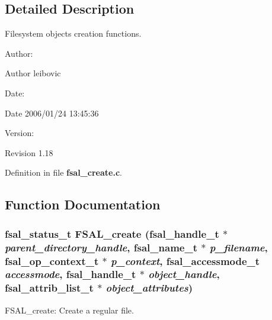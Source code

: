 \subsection{Detailed Description}
Filesystem objects creation functions. 

\begin{Desc}
\item[Author:]\end{Desc}
\begin{Desc}
\item[Author]leibovic \end{Desc}
\begin{Desc}
\item[Date:]\end{Desc}
\begin{Desc}
\item[Date]2006/01/24 13:45:36 \end{Desc}
\begin{Desc}
\item[Version:]\end{Desc}
\begin{Desc}
\item[Revision]1.18 \end{Desc}


Definition in file {\bf fsal\_\-create.c}.

\subsection{Function Documentation}
\subsubsection[{FSAL\_\-create}]{\setlength{\rightskip}{0pt plus 5cm}fsal\_\-status\_\-t FSAL\_\-create (fsal\_\-handle\_\-t $\ast$ {\em parent\_\-directory\_\-handle}, \/  fsal\_\-name\_\-t $\ast$ {\em p\_\-filename}, \/  fsal\_\-op\_\-context\_\-t $\ast$ {\em p\_\-context}, \/  fsal\_\-accessmode\_\-t {\em accessmode}, \/  fsal\_\-handle\_\-t $\ast$ {\em object\_\-handle}, \/  fsal\_\-attrib\_\-list\_\-t $\ast$ {\em object\_\-attributes})}\label{fsal__create_8c_b32064718b92ea123ea5cc7a6ff7cacd}


FSAL\_\-create: Create a regular file.

